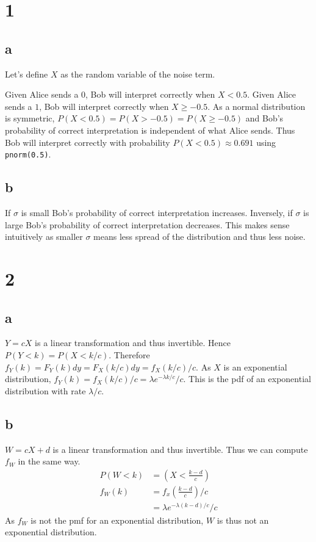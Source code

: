\documentclass[10pt]{article}
\begin{document}
\section*{1}
\subsection*{a}
Let's define $X$ as the random variable of the noise term.

Given Alice sends a $0$, Bob will interpret correctly when $X<0.5$. Given Alice sends a $1$, Bob will interpret correctly when $X\ge-0.5.$ As a normal distribution is symmetric, $P(X<0.5)=P(X>-0.5)=P(X\ge-0.5)$ and Bob's probability of correct interpretation is independent of what Alice sends. Thus Bob will interpret correctly with probability $P(X<0.5)\approx0.691$ using \texttt{pnorm(0.5)}.

\subsection*{b}
If $\sigma$ is small Bob's probability of correct interpretation increases. Inversely, if $\sigma$ is large Bob's probability of correct interpretation decreases. This makes sense intuitively as smaller $\sigma$ means less spread of the distribution and thus less noise.

\section*{2}
\subsection*{a}
$Y=cX$ is a linear transformation and thus invertible. Hence $P(Y<k)=P(X<k/c)$. Therefore $f_Y(k)=F_Y(k)dy=F_X(k/c)dy=f_X(k/c)/c.$ As $X$ is an exponential distribution, $f_Y(k)=f_X(k/c)/c=\lambda e^{-\lambda k/c}/c.$ This is the pdf of an exponential distribution with rate $\lambda /c.$

\subsection*{b}
$W=cX+d$ is a linear transformation and thus invertible. Thus we can compute $f_W$ in the same way.
\begin{align*}
    P(W<k)&=(X<\frac{k-d}{c})\\
    f_W(k)&=f_x\left (\frac{k-d}{c}\right )/c\\
    &=\lambda e^{-\lambda (k-d)/c}/c
\end{align*}
As $f_W$ is not the pmf for an exponential distribution, $W$ is thus not an exponential distribution.
\end{document}
